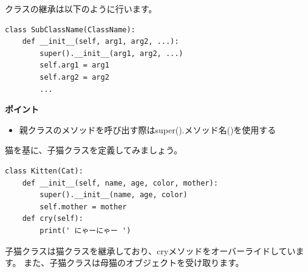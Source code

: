 \documentclass[a4paper,titlepage,dvipdfmx]{jarticle}
\begin{document}
クラスの継承は以下のように行います。
\begin{lstlisting}[caption=クラスの継承,label=inheritance]
class SubClassName(ClassName):
    def __init__(self, arg1, arg2, ...):
        super().__init__(arg1, arg2, ...)
        self.arg1 = arg1
        self.arg2 = arg2
        ...
\end{lstlisting}

\begin{itembox}[l]{\textbf{ポイント}}
  \begin{itemize}
    \item 親クラスのメソッドを呼び出す際はsuper().メソッド名()を使用する
  \end{itemize}
\end{itembox}

猫を基に、子猫クラスを定義してみましょう。
\begin{lstlisting}[caption=子猫クラスの定義,label=kitten]
class Kitten(Cat):
    def __init__(self, name, age, color, mother):
        super().__init__(name, age, color)
        self.mother = mother
    def cry(self):
        print(' にゃーにゃー ')
\end{lstlisting}

子猫クラスは猫クラスを継承しており、cryメソッドをオーバーライドしています。
また、子猫クラスは母猫のオブジェクトを受け取ります。
\end{document}
